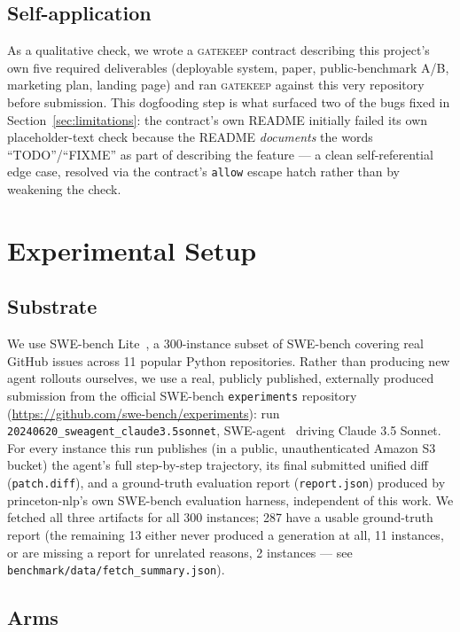 \documentclass{article}
\begin{document}
\subsection{Self-application}

As a qualitative check, we wrote a \textsc{gatekeep} contract describing
this project's own five required deliverables (deployable system, paper,
public-benchmark A/B, marketing plan, landing page) and ran
\textsc{gatekeep} against this very repository before submission. This
dogfooding step is what surfaced two of the bugs fixed in
Section~\ref{sec:limitations}: the contract's own README initially failed
its own placeholder-text check because the README \emph{documents} the
words ``TODO''/``FIXME'' as part of describing the feature --- a clean
self-referential edge case, resolved via the contract's \texttt{allow}
escape hatch rather than by weakening the check.

\section{Experimental Setup}

\subsection{Substrate}

We use SWE-bench Lite~\citep{jimenez2024swebench}, a 300-instance subset
of SWE-bench covering real GitHub issues across 11 popular Python
repositories. Rather than producing new agent rollouts ourselves, we use a
real, publicly published, externally produced submission from the
official SWE-bench \texttt{experiments} repository
(\url{https://github.com/swe-bench/experiments}): run
\texttt{20240620\_sweagent\_claude3.5sonnet}, SWE-agent~\citep{yang2024sweagent}
driving Claude 3.5 Sonnet. For every instance this run publishes (in a
public, unauthenticated Amazon S3 bucket) the agent's full step-by-step
trajectory, its final submitted unified diff (\texttt{patch.diff}), and a
ground-truth evaluation report (\texttt{report.json}) produced by
princeton-nlp's own SWE-bench evaluation harness, independent of this
work. We fetched all three artifacts for all 300 instances; 287 have a
usable ground-truth report (the remaining 13 either never produced a
generation at all, 11 instances, or are missing a report for unrelated
reasons, 2 instances --- see \texttt{benchmark/data/fetch\_summary.json}).

\subsection{Arms}
\end{document}
